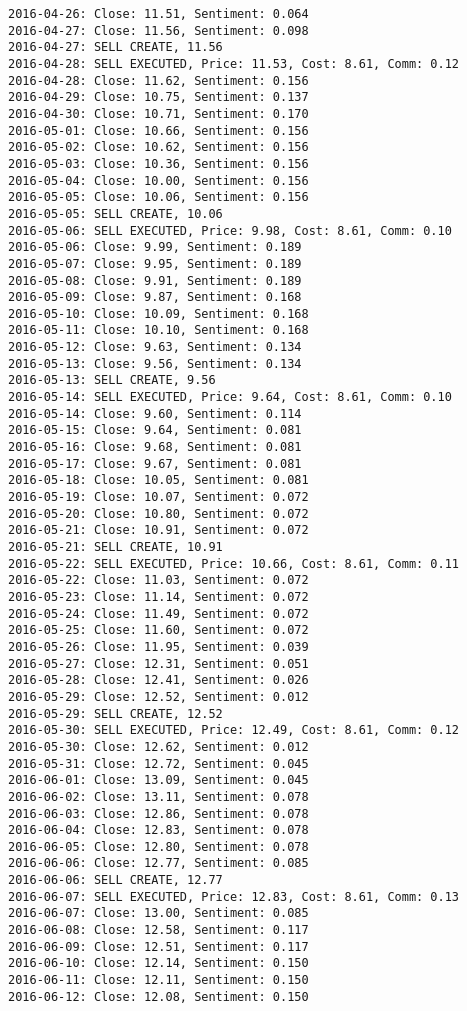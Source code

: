 \documentclass[11pt]{article}
\begin{document}
\begin{Verbatim}[commandchars=\\\{\}]
2016-04-26: Close: 11.51, Sentiment: 0.064
2016-04-27: Close: 11.56, Sentiment: 0.098
2016-04-27: SELL CREATE, 11.56
2016-04-28: SELL EXECUTED, Price: 11.53, Cost: 8.61, Comm: 0.12
2016-04-28: Close: 11.62, Sentiment: 0.156
2016-04-29: Close: 10.75, Sentiment: 0.137
2016-04-30: Close: 10.71, Sentiment: 0.170
2016-05-01: Close: 10.66, Sentiment: 0.156
2016-05-02: Close: 10.62, Sentiment: 0.156
2016-05-03: Close: 10.36, Sentiment: 0.156
2016-05-04: Close: 10.00, Sentiment: 0.156
2016-05-05: Close: 10.06, Sentiment: 0.156
2016-05-05: SELL CREATE, 10.06
2016-05-06: SELL EXECUTED, Price: 9.98, Cost: 8.61, Comm: 0.10
2016-05-06: Close: 9.99, Sentiment: 0.189
2016-05-07: Close: 9.95, Sentiment: 0.189
2016-05-08: Close: 9.91, Sentiment: 0.189
2016-05-09: Close: 9.87, Sentiment: 0.168
2016-05-10: Close: 10.09, Sentiment: 0.168
2016-05-11: Close: 10.10, Sentiment: 0.168
2016-05-12: Close: 9.63, Sentiment: 0.134
2016-05-13: Close: 9.56, Sentiment: 0.134
2016-05-13: SELL CREATE, 9.56
2016-05-14: SELL EXECUTED, Price: 9.64, Cost: 8.61, Comm: 0.10
2016-05-14: Close: 9.60, Sentiment: 0.114
2016-05-15: Close: 9.64, Sentiment: 0.081
2016-05-16: Close: 9.68, Sentiment: 0.081
2016-05-17: Close: 9.67, Sentiment: 0.081
2016-05-18: Close: 10.05, Sentiment: 0.081
2016-05-19: Close: 10.07, Sentiment: 0.072
2016-05-20: Close: 10.80, Sentiment: 0.072
2016-05-21: Close: 10.91, Sentiment: 0.072
2016-05-21: SELL CREATE, 10.91
2016-05-22: SELL EXECUTED, Price: 10.66, Cost: 8.61, Comm: 0.11
2016-05-22: Close: 11.03, Sentiment: 0.072
2016-05-23: Close: 11.14, Sentiment: 0.072
2016-05-24: Close: 11.49, Sentiment: 0.072
2016-05-25: Close: 11.60, Sentiment: 0.072
2016-05-26: Close: 11.95, Sentiment: 0.039
2016-05-27: Close: 12.31, Sentiment: 0.051
2016-05-28: Close: 12.41, Sentiment: 0.026
2016-05-29: Close: 12.52, Sentiment: 0.012
2016-05-29: SELL CREATE, 12.52
2016-05-30: SELL EXECUTED, Price: 12.49, Cost: 8.61, Comm: 0.12
2016-05-30: Close: 12.62, Sentiment: 0.012
2016-05-31: Close: 12.72, Sentiment: 0.045
2016-06-01: Close: 13.09, Sentiment: 0.045
2016-06-02: Close: 13.11, Sentiment: 0.078
2016-06-03: Close: 12.86, Sentiment: 0.078
2016-06-04: Close: 12.83, Sentiment: 0.078
2016-06-05: Close: 12.80, Sentiment: 0.078
2016-06-06: Close: 12.77, Sentiment: 0.085
2016-06-06: SELL CREATE, 12.77
2016-06-07: SELL EXECUTED, Price: 12.83, Cost: 8.61, Comm: 0.13
2016-06-07: Close: 13.00, Sentiment: 0.085
2016-06-08: Close: 12.58, Sentiment: 0.117
2016-06-09: Close: 12.51, Sentiment: 0.117
2016-06-10: Close: 12.14, Sentiment: 0.150
2016-06-11: Close: 12.11, Sentiment: 0.150
2016-06-12: Close: 12.08, Sentiment: 0.150

\end{Verbatim}
\end{document}
